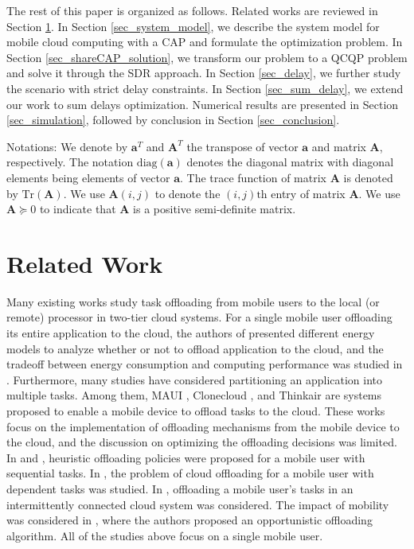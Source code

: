 \documentclass[10pt,journal,compsoc]{IEEEtran}
\begin{document}
The rest of this paper is organized as follows. Related works are
reviewed in Section \ref{sec_related_work}. In Section
\ref{sec_system_model}, we describe the system model for mobile
cloud computing with a CAP and formulate the optimization problem.
In Section \ref{sec_shareCAP_solution}, we transform our problem to
a QCQP problem and solve it through the SDR approach. In Section
\ref{sec_delay}, we further study the scenario with strict delay
constraints. In Section \ref{sec_sum_delay}, we extend our work to
sum delays optimization. Numerical results are presented in Section
\ref{sec_simulation}, followed by conclusion in Section
\ref{sec_conclusion}.

Notations: We denote by $\mathbf{a}^T$ and $\mathbf{A}^T$ the
transpose of vector $\mathbf{a}$ and matrix $\mathbf{A}$,
respectively. The notation $\mathrm{diag}(\mathbf{a})$ denotes the
diagonal matrix with diagonal elements being elements of vector
$\mathbf{a}$. The trace function of matrix $\mathbf{A}$ is denoted
by $\mathrm{Tr}(\mathbf{A})$. We use $\mathbf{A}(i,j)$ to denote the
$(i,j)\mathrm{th}$ entry of matrix $\mathbf{A}$. We use $\mathbf{A}
\succeq 0$ to indicate that $\mathbf{A}$ is a positive semi-definite
matrix.

\section{Related Work}\label{sec_related_work} Many existing
works study task offloading from mobile users to the local (or
remote) processor in two-tier cloud systems. For a single mobile
user offloading its entire application to the cloud, the authors of
\cite{kumar2010,zhang2013,wen2012} presented different energy models
to analyze whether or not to offload application to the cloud, and
the tradeoff between energy consumption and computing performance
was studied in \cite{barbarossa2013,munoz2015}. Furthermore, many
studies have considered partitioning an application into multiple tasks. Among
them, MAUI \cite{cuervo2010}, Clonecloud \cite{chun2011}, and Thinkair
\cite{kosta2012} are systems proposed to enable a mobile device to
offload tasks to the cloud. These works focus on the implementation
of offloading mechanisms from the mobile device to the cloud, and
the discussion on optimizing the offloading decisions was limited.
In \cite{zhang2012} and \cite{zhang2013infocom}, heuristic
offloading policies were proposed for a mobile user with sequential
tasks.
 In \cite{mahmoodi2016,kao2015,wu2016}, the problem of cloud offloading for a mobile user
with dependent tasks was studied. In \cite{zhang2015}, offloading a
mobile user's tasks in an intermittently connected cloud system was
considered.
The impact of mobility was considered in \cite{Truong-Huu2014},
where the authors proposed an opportunistic offloading algorithm.
All of the studies above focus on a single mobile user.
\end{document}

